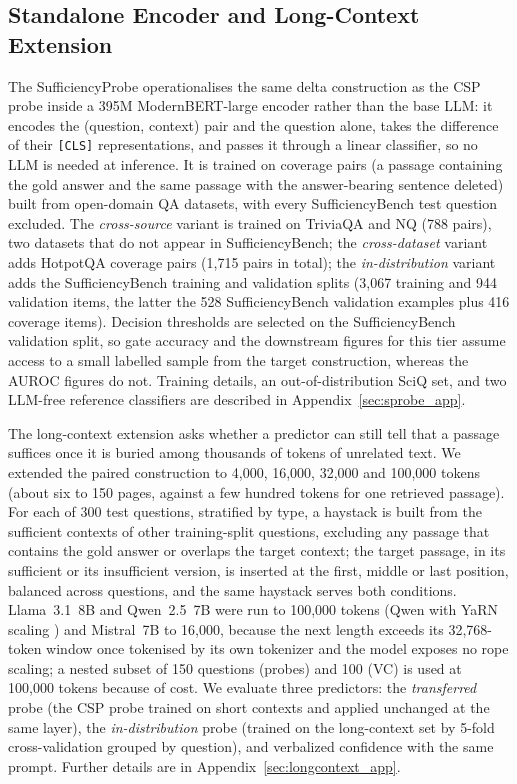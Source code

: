 \documentclass[acmsmall,screen,review]{acmart}
\newcommand{\bench}{SufficiencyBench}
\newcommand{\sprobe}{SufficiencyProbe}
\begin{document}
\subsection{Standalone Encoder and Long-Context Extension}
\label{sec:sufficiencyprobe}

The \sprobe{} operationalises the same delta construction as the CSP probe inside a 395M ModernBERT-large \citep{warner2024modernbert} encoder rather than the base LLM: it encodes the (question, context) pair and the question alone, takes the difference of their \texttt{[CLS]} representations, and passes it through a linear classifier, so no LLM is needed at inference. It is trained on coverage pairs (a passage containing the gold answer and the same passage with the answer-bearing sentence deleted) built from open-domain QA datasets, with every \bench{} test question excluded. The \emph{cross-source} variant is trained on TriviaQA and NQ (788 pairs), two datasets that do not appear in \bench{}; the \emph{cross-dataset} variant adds HotpotQA coverage pairs (1,715 pairs in total); the \emph{in-distribution} variant adds the \bench{} training and validation splits (3,067 training and 944 validation items, the latter the 528 \bench{} validation examples plus 416 coverage items). Decision thresholds are selected on the \bench{} validation split, so gate accuracy and the downstream figures for this tier assume access to a small labelled sample from the target construction, whereas the AUROC figures do not. Training details, an out-of-distribution SciQ set, and two LLM-free reference classifiers are described in Appendix~\ref{sec:sprobe_app}.

The long-context extension asks whether a predictor can still tell that a passage suffices once it is buried among thousands of tokens of unrelated text. We extended the paired construction to 4,000, 16,000, 32,000 and 100,000 tokens (about six to 150 pages, against a few hundred tokens for one retrieved passage). For each of 300 test questions, stratified by type, a haystack is built from the sufficient contexts of other training-split questions, excluding any passage that contains the gold answer or overlaps the target context; the target passage, in its sufficient or its insufficient version, is inserted at the first, middle or last position, balanced across questions, and the same haystack serves both conditions. Llama~3.1~8B and Qwen~2.5~7B were run to 100,000 tokens (Qwen with YaRN scaling \citep{peng2024yarn}) and Mistral~7B to 16,000, because the next length exceeds its 32,768-token window once tokenised by its own tokenizer and the model exposes no rope scaling; a nested subset of 150 questions (probes) and 100 (VC) is used at 100,000 tokens because of cost. We evaluate three predictors: the \emph{transferred} probe (the CSP probe trained on short contexts and applied unchanged at the same layer), the \emph{in-distribution} probe (trained on the long-context set by 5-fold cross-validation grouped by question), and verbalized confidence with the same prompt. Further details are in Appendix~\ref{sec:longcontext_app}.
\end{document}
